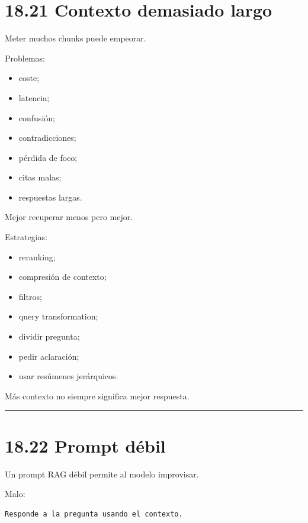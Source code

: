\section{18.21 Contexto demasiado largo}\label{contexto-demasiado-largo}

Meter muchos chunks puede empeorar.

Problemas:

\begin{itemize}
\tightlist
\item
  coste;
\item
  latencia;
\item
  confusión;
\item
  contradicciones;
\item
  pérdida de foco;
\item
  citas malas;
\item
  respuestas largas.
\end{itemize}

Mejor recuperar menos pero mejor.

Estrategias:

\begin{itemize}
\tightlist
\item
  reranking;
\item
  compresión de contexto;
\item
  filtros;
\item
  query transformation;
\item
  dividir pregunta;
\item
  pedir aclaración;
\item
  usar resúmenes jerárquicos.
\end{itemize}

Más contexto no siempre significa mejor respuesta.

\begin{center}\rule{0.5\linewidth}{0.5pt}\end{center}

\section{18.22 Prompt débil}\label{prompt-duxe9bil}

Un prompt RAG débil permite al modelo improvisar.

Malo:

\begin{lstlisting}
Responde a la pregunta usando el contexto.
\end{lstlisting}

